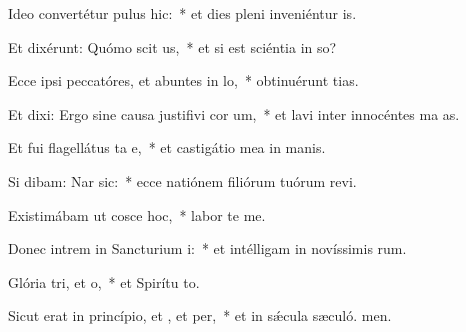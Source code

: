 \item Ideo convertétur pulus  hic:~* et dies pleni inveniéntur  is.
\item Et dixérunt: Quómo scit us,~* et si est sciéntia in so?
\item Ecce ipsi peccatóres, et abuntes in lo,~* obtinuérunt tias.
\item Et dixi: Ergo sine causa justifivi cor um,~* et lavi inter innocéntes ma as.
\item Et fui flagellátus ta e,~* et castigátio mea in manis.
\item Si dibam: Nar sic:~* ecce natiónem filiórum tuórum revi.
\item Existimábam ut cosce hoc,~* labor  te me.
\item Donec intrem in Sancturium i:~* et intélligam in novíssimis rum.
\item Glória tri, et o,~* et Spirítu to.
\item Sicut erat in princípio, et , et per,~* et in sǽcula sæculó. men.

